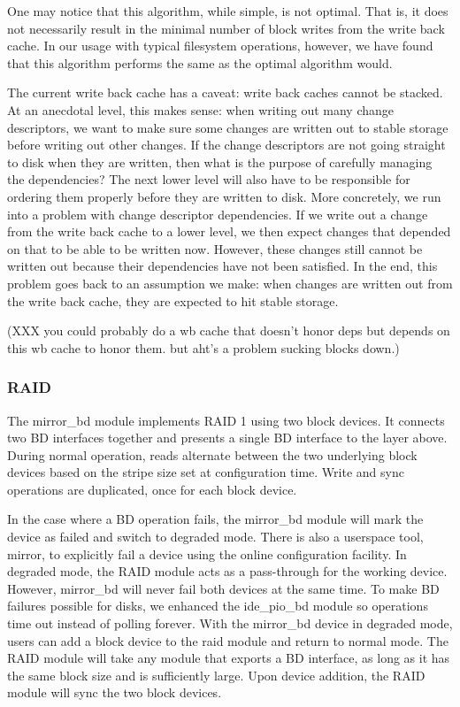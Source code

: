 One may notice that this algorithm, while simple, is not optimal. That is, it
does not necessarily result in the minimal number of block writes from the write
back cache. In our usage with typical filesystem operations, however, we have
found that this algorithm performs the same as the optimal algorithm would.

The current write back cache has a caveat: write back caches cannot be stacked.
At an anecdotal level, this makes sense: when writing out many change
descriptors, we want to make sure some changes are written out to stable storage
before writing out other changes. If the change descriptors are not going
straight to disk when they are written, then what is the purpose of carefully
managing the dependencies? The next lower level will also have to be responsible
for ordering them properly before they are written to disk. More concretely, we
run into a problem with change descriptor dependencies. If we write out a change
from the write back cache to a lower level, we then expect changes that depended
on that to be able to be written now. However, these changes still cannot be
written out because their dependencies have not been satisfied. In the end, this
problem goes back to an assumption we make: when changes are written out from
the write back cache, they are expected to hit stable storage.

(XXX you could probably do a wb cache that doesn't honor deps but depends on
this wb cache to honor them. but aht's a problem sucking blocks down.)

\subsubsection{RAID}
\label{sec:solution:impl:raid}

The mirror\_bd module implements RAID 1 using two block devices. It connects two
BD interfaces together and presents a single BD interface to the layer above.
During normal operation, reads alternate between the two underlying block
devices based on the stripe size set at configuration time. Write and sync
operations are duplicated, once for each block device.

In the case where a BD operation fails, the mirror\_bd module will mark the
device as failed and switch to degraded mode. There is also a userspace tool,
mirror, to explicitly fail a device using the online configuration facility. In
degraded mode, the RAID module acts as a pass-through for the working device.
However, mirror\_bd will never fail both devices at the same time. To make BD
failures possible for disks, we enhanced the ide\_pio\_bd module so operations
time out instead of polling forever. With the mirror\_bd device in degraded
mode, users can add a block device to the raid module and return to normal mode.
The RAID module will take any module that exports a BD interface, as long as it
has the same block size and is sufficiently large. Upon device addition, the
RAID module will sync the two block devices.

